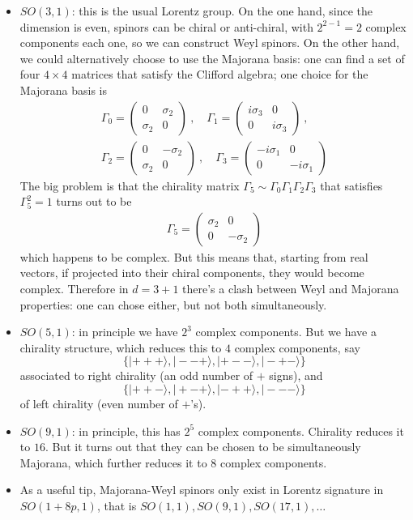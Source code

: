 \documentclass[a4paper,12pt]{article}
\numberwithin{equation}{section}
\numberwithin{exe}{section}
\newcommand{\G}{{\Gamma}}
\newcommand{\s}{{\sigma}}
\newcommand{\ket}[1]{| #1 \rangle}
\begin{document}
\begin{itemize}
	\item $SO(3,1)$: this is the usual Lorentz group. On the one hand, since the dimension is even, spinors can be chiral or anti-chiral, with $2^{2-1}=2$ complex components each one, so we can construct Weyl spinors. On the other hand, we could alternatively choose to use the Majorana basis: one can find a set of four $4\times 4$ matrices that satisfy the Clifford algebra; one choice for the Majorana basis is
		\begin{align}\label{}
		\G_0 = \left(
			\begin{array}{cc}
			0 & \s_2 \\
			\s_2 &  0
			\end{array}
		\right)\ ,\quad \G_1= \left(
			\begin{array}{cc}
			i\s_3 & 0 \\
			0 & i\s_3
			\end{array}
		\right)\ ,\\
		\G_2 = \left(
			\begin{array}{cc}
			0 & -\s_2 \\
			\s_2 & 0
			\end{array}
		\right)\ ,\quad \G_3= \left(
			\begin{array}{cc}
			-i\s_1 & 0 \\
			0 &  -i\s_1
			\end{array}
		\right)
		\end{align}
	The big problem is that the chirality matrix $\G_5\sim \G_0\G_1\G_2\G_3$ that satisfies $\G_5^2=1$ turns out to be
		\begin{align}\label{}
		\G_5= \left( \begin{array}{cc} \sigma_2 & 0 \\
		0 & -\sigma_2  \end{array} \right) 
		\end{align}
which happens to be complex. But this means that, starting from real vectors, if projected into their chiral components, they would become complex. Therefore in $d=3+1$ there's a clash between Weyl and Majorana properties: one can chose either, but not both simultaneously. 
	\item $SO(5,1)$: in principle we have $2^3$ complex components. But we have a chirality structure, which reduces this to $4$ complex components, say
	$$\{ \ket{+++},\ket{--+},\ket{+--},\ket{-+-} \}$$
	associated to right chirality (an odd number of $+$ signs), and
	$$\{ \ket{++-},\ket{+-+},\ket{-++},\ket{---}  \}$$
	of left chirality (even number of $+$'s). 
	\item $SO(9,1)$: in principle, this has $2^5$ complex components. Chirality reduces it to $16$. But it turns out that they can be chosen to be simultaneously Majorana, which further reduces it to $8$ complex components. 
	\item As a useful tip, Majorana-Weyl spinors only exist in Lorentz signature in $SO(1+8p,1)$, that is $SO(1,1),SO(9,1),SO(17,1),\hdots$ 

\end{itemize}
\end{document}
